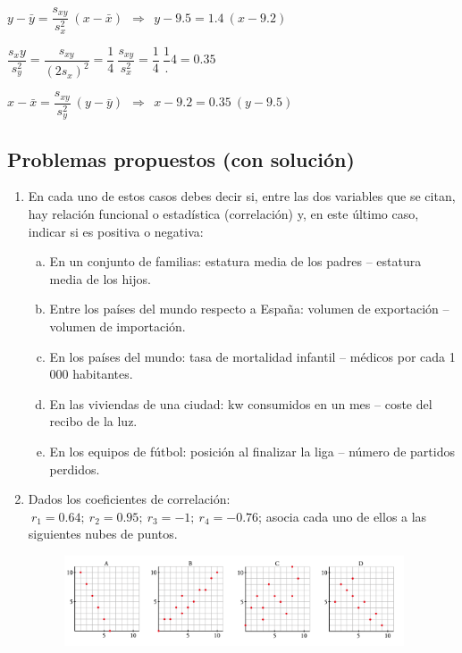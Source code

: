 $y-\bar y=\dfrac{s_{xy}}{s_x^2}\ (x-\bar x) \ \ \Rightarrow \ \ y-9.5=1.4\ (x-9.2)$

$\dfrac{s_xy}{s_y^2}=\dfrac{s_{xy}}{(2s_x)^2}=\dfrac 1 4 \ \dfrac{s_{xy}}{s_x^2}=\dfrac 1 4 \ \dfrac 1.4 =0.35$

$x-\bar x=\dfrac{s_{xy}}{s_y^2}\ (y-\bar y) \ \ \Rightarrow \ \ x-9.2=0.35\ (y-9.5)$





 
\subsection{Problemas propuestos (con solución)}



\begin{adjustwidth}{20pt}{10pt}
\begin{enumerate}[PB. 1. ]

\item En cada uno de estos casos debes decir si, entre las dos variables que se citan, hay relación funcional o estadística (correlación) y, en este último caso, indicar si es positiva o negativa:

	\begin{enumerate}[a) ]
	\item En un conjunto de familias: estatura media de los padres -- estatura media de los hijos.
	\item Entre los países del mundo respecto a España: volumen de exportación -- volumen de importación.
	\item En los países del mundo: tasa de mortalidad infantil -- médicos por cada 1 000 habitantes.
	\item En las viviendas de una ciudad: kw consumidos en un mes -- coste del recibo de la luz.
	\item En los equipos de fútbol: posición al finalizar la liga -- número de partidos perdidos.
	\end{enumerate}

\hspace{-1cm}\vspace{1cm}



\item Dados los coeficientes de correlación: $\ r_1=0.64; \ r_2=0.95;\ r_3=-1; \ r_4=-0.76$; asocia cada uno de ellos a las siguientes nubes de puntos.

	\begin{figure}[H]
			\centering
			\includegraphics[width=0.95\textwidth]{imagenes/imagenes03/T03IM19.png}
	\end{figure}
 

\end{enumerate}
\end{adjustwidth}
